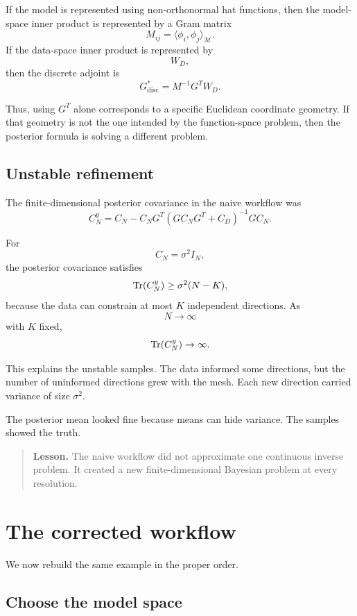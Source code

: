 \documentclass[11pt,a4paper]{book}
\newenvironment{lesson}
  {\begin{quote}\textbf{Lesson.}}
  {\end{quote}}
\newcommand{\M}{\mathcal{M}}      %
\begin{document}
If the model is represented using non-orthonormal hat functions, then the
model-space inner product is represented by a Gram matrix
\[
    M_{ij}
    =
    \langle \phi_i,\phi_j\rangle_{\M}.
\]
If the data-space inner product is represented by
\[
    W_D,
\]
then the discrete adjoint is
\[
    G^\ast_{\mathrm{disc}}
    =
    M^{-1}G^T W_D.
\]

Thus, using $G^T$ alone corresponds to a specific Euclidean coordinate geometry.
If that geometry is not the one intended by the function-space problem, then
the posterior formula is solving a different problem.

\subsection{Unstable refinement}

The finite-dimensional posterior covariance in the naive workflow was
\[
    C_N^y
    =
    C_N
    -
    C_NG^T
    \left(
        GC_NG^T+C_D
    \right)^{-1}
    GC_N.
\]

For
\[
    C_N=\sigma^2 I_N,
\]
the posterior covariance satisfies
\[
    \Tr(C_N^y)
    \geq
    \sigma^2(N-K),
\]
because the data can constrain at most $K$ independent directions. As
\[
    N\to\infty
\]
with $K$ fixed,
\[
    \Tr(C_N^y)\to\infty.
\]

This explains the unstable samples. The data informed some directions, but the
number of uninformed directions grew with the mesh. Each new direction carried
variance of size $\sigma^2$.

The posterior mean looked fine because means can hide variance. The samples
showed the truth.

\begin{lesson}
The naive workflow did not approximate one continuous inverse problem. It
created a new finite-dimensional Bayesian problem at every resolution.
\end{lesson}

\section{The corrected workflow}

We now rebuild the same example in the proper order.

\subsection{Choose the model space}
\end{document}
